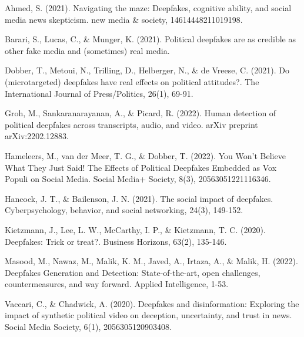 \documentclass[
  journal=small,
  manuscript=article-type,  %
  year=2020,
  volume=37,
]{cup-journal}
\begin{document}
\newpage
\begin{thebibliography}{9}

Ahmed, S. (2021). Navigating the maze: Deepfakes, cognitive ability, and social media news skepticism. new media \& society, 14614448211019198.

Barari, S., Lucas, C., \& Munger, K. (2021). Political deepfakes are as credible as other fake media and (sometimes) real media.

Dobber, T., Metoui, N., Trilling, D., Helberger, N., \& de Vreese, C. (2021). Do (microtargeted) deepfakes have real effects on political attitudes?. The International Journal of Press/Politics, 26(1), 69-91.

Groh, M., Sankaranarayanan, A., \& Picard, R. (2022). Human detection of political deepfakes across transcripts, audio, and video. arXiv preprint arXiv:2202.12883.

Hameleers, M., van der Meer, T. G., \& Dobber, T. (2022). You Won’t Believe What They Just Said! The Effects of Political Deepfakes Embedded as Vox Populi on Social Media. Social Media+ Society, 8(3), 20563051221116346.

Hancock, J. T., \& Bailenson, J. N. (2021). The social impact of deepfakes. Cyberpsychology, behavior, and social networking, 24(3), 149-152.

Kietzmann, J., Lee, L. W., McCarthy, I. P., \& Kietzmann, T. C. (2020). Deepfakes: Trick or treat?. Business Horizons, 63(2), 135-146.

Masood, M., Nawaz, M., Malik, K. M., Javed, A., Irtaza, A., \& Malik, H. (2022). Deepfakes Generation and Detection: State-of-the-art, open challenges, countermeasures, and way forward. Applied Intelligence, 1-53.

Vaccari, C., \& Chadwick, A. (2020). Deepfakes and disinformation: Exploring the impact of synthetic political video on deception, uncertainty, and trust in news. Social Media Society, 6(1), 2056305120903408.

\end{thebibliography}
\end{document}
